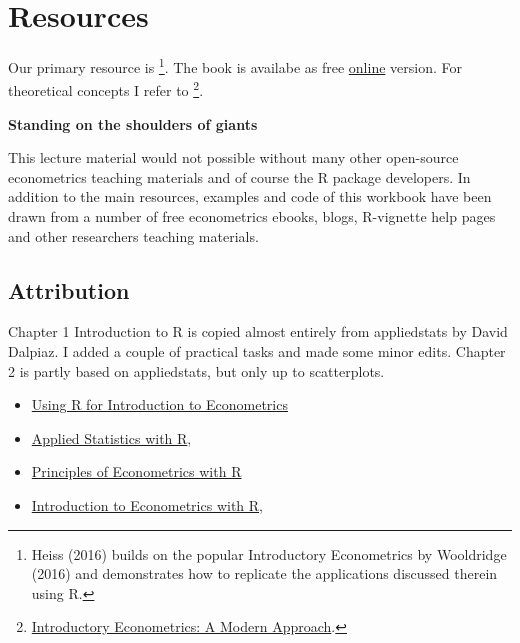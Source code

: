 \documentclass[]{book}
\providecommand{\tightlist}{%
  \setlength{\itemsep}{0pt}\setlength{\parskip}{0pt}}
\let\rmarkdownfootnote\footnote%
\def\footnote{\protect\rmarkdownfootnote}
\begin{document}
\hypertarget{resources}{%
\section*{Resources}\label{resources}}

Our primary resource is \citet{heiss2016using} \footnote{Heiss (2016)
  builds on the popular Introductory Econometrics by Wooldridge (2016)
  and demonstrates how to replicate the applications discussed therein
  using R.}. The book is availabe as free
\href{http://www.urfie.net/read.html}{online} version. For theoretical
concepts I refer to \citet{wooldridge2015introductory}\footnote{\href{https://books.google.ee/books/about/Introductory_Econometrics_A_Modern_Appro.html?id=wUF4BwAAQBAJ\&source=kp_cover\&redir_esc=y}{Introductory
  Econometrics: A Modern Approach}.}.

\textbf{Standing on the shoulders of giants}

This lecture material would not possible without many other open-source
econometrics teaching materials and of course the R package developers.
In addition to the main resources, examples and code of this workbook
have been drawn from a number of free econometrics ebooks, blogs,
R-vignette help pages and other researchers teaching materials.

\hypertarget{attribution}{%
\subsection*{Attribution}\label{attribution}}

Chapter 1 Introduction to R is copied almost entirely from appliedstats
by David Dalpiaz. I added a couple of practical tasks and made some
minor edits. Chapter 2 is partly based on appliedstats, but only up to
scatterplots.

\begin{itemize}
\tightlist
\item
  \href{https://emwikts1970.github.io/URFITE-Bookdown/}{Using R for
  Introduction to Econometrics}
\item
  \href{https://daviddalpiaz.github.io/appliedstats/}{Applied Statistics
  with R}, \citet{dalpiaz2016}
\item
  \href{https://bookdown.org/ccolonescu/RPoE4/}{Principles of
  Econometrics with R}
\item
  \href{https://scpoecon.github.io/ScPoEconometrics/}{Introduction to
  Econometrics with R}, \citet{oswald2018introduction}
\end{itemize}
\end{document}

